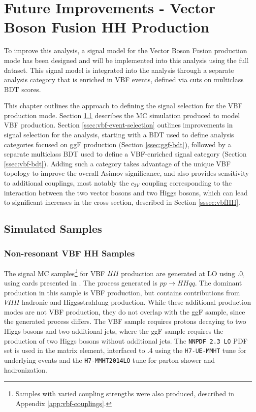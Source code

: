 \chapter{Future Improvements - Vector Boson Fusion HH Production} \label{ch:vbf}

To improve this analysis, a signal model for the Vector Boson Fusion production mode has been designed and will be implemented into this analysis using the full \RunTwo dataset. This signal model is integrated into the analysis through a separate analysis category that is enriched in VBF events, defined via cuts on multiclass \gls{BDT} scores.

This chapter outlines the approach to defining the signal selection for the \gls{VBF} production mode. Section \ref{sec:vbf-samples} describes the \gls{MC} simulation produced to model VBF \hhyybb production. Section \ref{ssec:vbf-event-selection} outlines improvements in signal selection for the analysis, starting with a \gls{BDT} used to define analysis categories focused on ggF \hh production (Section \ref{ssec:ggf-bdt}), followed by a separate multiclass \gls{BDT} used to define a VBF-enriched signal category (Section \ref{ssec:vbf-bdt}). Adding such a category takes advantage of the unique \gls{VBF} topology to improve the overall Asimov significance, and also provides sensitivity to additional couplings, most notably the $c_{2V}$ coupling corresponding to the interaction between the two vector bosons and two Higgs bosons, which can lead to significant increases in the \hh cross section, described in Section \ref{sssec:vbfHH}.

\section{Simulated Samples} \label{sec:vbf-samples}

\subsection{Non-resonant VBF HH Samples} \label{ssec:vbf-samples-production}

The signal MC samples\footnote{Samples with varied coupling strengths were also produced, described in Appendix \ref{app:vbf-couplings}.} for VBF $HH$ production are generated at LO using .0, using cards presented in \cite{vbfhh}. The process generated is $pp \rightarrow HHqq$. The dominant production in this sample is VBF \hh production, but contains contributions from $VHH$  hadronic and Higgsstrahlung production. While these additional production modes are not \gls{VBF} \hh production, they do not overlap with the \gls{ggF} \hh sample, since the generated process differs. The \gls{VBF} sample requires protons decaying to two Higgs bosons and two additional jets, where the \gls{ggF} sample requires the production of two Higgs bosons without additional jets. The \texttt{NNPDF 2.3 LO} PDF set \cite{NNPDF} is used in the matrix element, interfaced to .4 using the \texttt{H7-UE-MMHT} tune for underlying events and the \texttt{H7-MMHT2014LO} tune for parton shower and hadronization.

